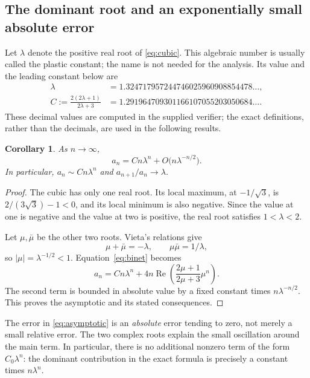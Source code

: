 \documentclass[11pt,letterpaper]{article}
\numberwithin{equation}{section}
\newtheorem{corollary}[theorem]{Corollary}
\theoremstyle{definition}
\theoremstyle{remark}
\DeclareMathOperator{\RePart}{Re}
\begin{document}
\subsection{The dominant root and an exponentially small absolute error}
Let $\lambda$ denote the positive real root of \eqref{eq:cubic}.
This algebraic number is usually called the plastic constant; the
name is not needed for the analysis. Its value and the leading
constant below are
\begin{align}
 \lambda&=1.324717957244746025960908854478\ldots,\label{eq:lambda}\\
 C:=\frac{2(2\lambda+1)}{2\lambda+3}
 &=1.291964709301166107055203050684\ldots.\label{eq:C}
\end{align}
These decimal values are computed in the supplied verifier; the
exact definitions, rather than the decimals, are used in the
following results.

\begin{corollary}\label{cor:asymptotic}
As $n\to\infty$,
\begin{equation}\label{eq:asymptotic}
\boxed{\displaystyle
 a_n=Cn\lambda^n+O\bigl(n\lambda^{-n/2}\bigr).}
\end{equation}
In particular, $a_n\sim Cn\lambda^n$ and $a_{n+1}/a_n\to\lambda$.
\end{corollary}
\begin{proof}
The cubic has only one real root. Its local maximum, at
$-1/\sqrt3$, is $2/(3\sqrt3)-1<0$, and its local minimum is also
negative. Since the value at one is negative and the value at two
is positive, the real root satisfies $1<\lambda<2$.

Let $\mu,\bar\mu$ be the other two roots. Vieta's relations give
\[
 \mu+\bar\mu=-\lambda,\qquad
 \mu\bar\mu=1/\lambda,
\]
so $|\mu|=\lambda^{-1/2}<1$. Equation~\eqref{eq:binet} becomes
\begin{equation}\label{eq:oscillatory}
 a_n=Cn\lambda^n+
 4n\RePart\left(\frac{2\mu+1}{2\mu+3}\mu^n\right).
\end{equation}
The second term is bounded in absolute value by a fixed constant
times $n\lambda^{-n/2}$. This proves the asymptotic and its stated
consequences.
\end{proof}

The error in \eqref{eq:asymptotic} is an \emph{absolute} error tending
to zero, not merely a small relative error. The two complex roots
explain the small oscillation around the main term. In particular,
there is no additional nonzero term of the form $C_0\lambda^n$:
the dominant contribution in the exact formula is precisely a
constant times $n\lambda^n$.
\end{document}
